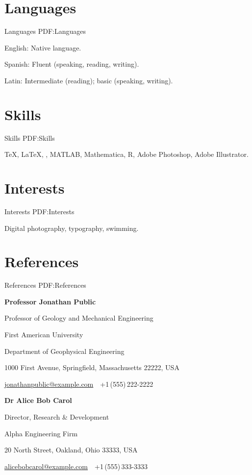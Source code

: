 \documentclass[a4paper,10pt,oneside]{article}
\begin{document}
\begin{body}

\section
{Languages}
{Languages}
{PDF:Languages}

English: Native language.
\par
Spanish: Fluent (speaking, reading, writing).
\par
Latin: Intermediate (reading); basic (speaking, writing).



\section
{Skills}
{Skills}
{PDF:Skills}

{\TeX}, {\LaTeX}, {\XeLaTeX},
MATLAB,
Mathematica,
R,
Adobe Photoshop,
Adobe Illustrator.


\section
{Interests}
{Interests}
{PDF:Interests}

Digital photography,
typography,
swimming.


\section
{References}
{References}
{PDF:References}

\textbf{Professor Jonathan Public}
\par
Professor of Geology and Mechanical Engineering
\begin{detail}
First American University
\par
Department of Geophysical Engineering
\par
1000 First Avenue, Springfield, Massachusetts 22222, USA
\par
\href{mailto:jonathanpublic@example.com}
{jonathanpublic@example.com}
\,\BulletSymbol\,
+1\,(555)\,222-2222
\end{detail}

\EntryGap
\textbf{Dr Alice Bob Carol}
\par
Director, Research \& Development
\begin{detail}
Alpha Engineering Firm
\par
20 North Street, Oakland, Ohio 33333, USA
\par
\href{mailto:alicebobcarol@example.com}
{alicebobcarol@example.com}
\,\BulletSymbol\,
+1\,(555)\,333-3333
\end{detail}


\end{body}
\end{document}

